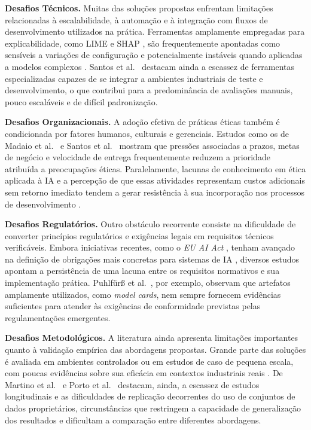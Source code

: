 \textbf{Desafios Técnicos.} Muitas das soluções propostas enfrentam limitações relacionadas à escalabilidade, à automação e à integração com fluxos de desenvolvimento utilizados na prática. Ferramentas amplamente empregadas para explicabilidade, como LIME \cite{Ribeiro2016} e SHAP \cite{Lundberg2017}, são frequentemente apontadas como sensíveis a variações de configuração e potencialmente instáveis quando aplicadas a modelos complexos \cite{S022, S045}. Santos et al.~\cite{S022} destacam ainda a escassez de ferramentas especializadas capazes de se integrar a ambientes industriais de teste e desenvolvimento, o que contribui para a predominância de avaliações manuais, pouco escaláveis e de difícil padronização.

\textbf{Desafios Organizacionais.} A adoção efetiva de práticas éticas também é condicionada por fatores humanos, culturais e gerenciais. Estudos como os de Madaio et al.~\cite{S017} e Santos et al.~\cite{S022} mostram que pressões associadas a prazos, metas de negócio e velocidade de entrega frequentemente reduzem a prioridade atribuída a preocupações éticas. Paralelamente, lacunas de conhecimento em ética aplicada à IA e a percepção de que essas atividades representam custos adicionais sem retorno imediato tendem a gerar resistência à sua incorporação nos processos de desenvolvimento \cite{S017, S022, S035}.

\textbf{Desafios Regulatórios.} Outro obstáculo recorrente consiste na dificuldade de converter princípios regulatórios e exigências legais em requisitos técnicos verificáveis. Embora iniciativas recentes, como o \textit{EU AI Act} \cite{EUAIAct2024}, tenham avançado na definição de obrigações mais concretas para sistemas de IA \cite{S052, S023}, diversos estudos apontam a persistência de uma lacuna entre os requisitos normativos e sua implementação prática. Puhlfürß et al.~\cite{S023}, por exemplo, observam que artefatos amplamente utilizados, como \textit{model cards}, nem sempre fornecem evidências suficientes para atender às exigências de conformidade previstas pelas regulamentações emergentes.

\textbf{Desafios Metodológicos.} A literatura ainda apresenta limitações importantes quanto à validação empírica das abordagens propostas. Grande parte das soluções é avaliada em ambientes controlados ou em estudos de caso de pequena escala, com poucas evidências sobre sua eficácia em contextos industriais reais \cite{S034, S058}. De Martino et al.~\cite{S040} e Porto et al.~\cite{S058} destacam, ainda, a escassez de estudos longitudinais e as dificuldades de replicação decorrentes do uso de conjuntos de dados proprietários, circunstâncias que restringem a capacidade de generalização dos resultados e dificultam a comparação entre diferentes abordagens.

